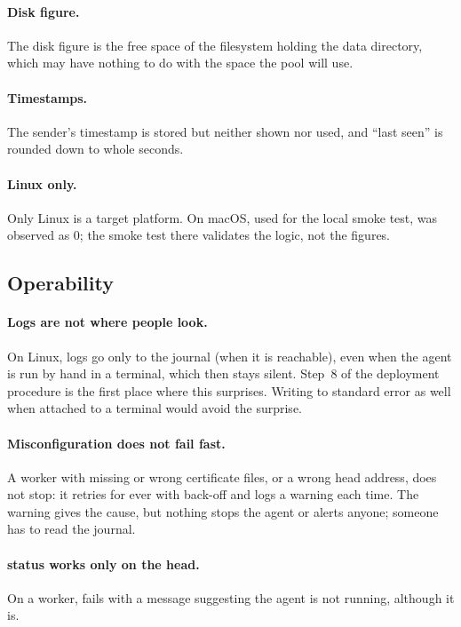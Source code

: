 \documentclass{article}
\begin{document}
\paragraph{Disk figure.}
The disk figure is the free space of the filesystem holding the data
directory, which may have nothing to do with the space the pool will use.

\paragraph{Timestamps.}
The sender's timestamp is stored but neither shown nor used, and
``last seen'' is rounded down to whole seconds.

\paragraph{Linux only.}
Only Linux is a target platform. On macOS, used for the local smoke test,
 was observed as 0; the smoke test there validates the
logic, not the figures.

\subsection{Operability}

\paragraph{Logs are not where people look.}
On Linux, logs go only to the journal (when it is reachable), even when
the agent is run by hand in a terminal, which then stays silent. Step~8
of the deployment procedure is the first place where this surprises.
Writing to standard error as well when attached to a terminal would avoid
the surprise.

\paragraph{Misconfiguration does not fail fast.}
A worker with missing or wrong certificate files, or a wrong head
address, does not stop: it retries for ever with back-off and logs a
warning each time. The warning gives the cause, but nothing stops the
agent or alerts anyone; someone has to read the journal.

\paragraph{status works only on the head.}
On a worker,  fails with a message suggesting the
agent is not running, although it is.
\end{document}

